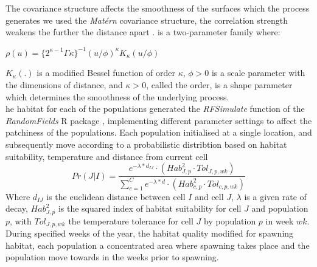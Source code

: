 \documentclass[review]{elsarticle}
\begin{document}
The covariance structure affects the smoothness of the surfaces which the
process generates we used the \textit{Matérn}
 covariance structure,
 the correlation strength weakens the further
the distance apart .
 is a two-parameter family where: 
\begin{center}
	$\rho(u) = \{2^{\kappa -
		1}\Gamma{\kappa}\}^{-1}(u/\phi)^{\kappa}K_{\kappa}(u/\phi)$
\end{center}
$K_{\kappa}(.)$ is a modified Bessel function of order $\kappa$, $\phi >
0$ is a scale parameter with the dimensions of distance, and $\kappa > 0$,
called the order, is a shape parameter which determines the smoothness of the
underlying process. \\

he habitat for each of the
populations  generated 
the \textit{RFSimulate} function of the \textit{RandomFields} R package
\citep{Schlater2015}, implementing different parameter settings to affect the
patchiness of the populations. Each population 
initialised at a single location, and subsequently move
according to a probabilistic distribtion based on habitat
suitability, temperature and distance from current cell 
\begin{equation}
	Pr(J | I) = \frac{e^{-\lambda * d_{IJ}} \cdot
		(Hab_{J,p}^2 \cdot Tol_{J,p,wk})}{\sum\limits_{c=1}^{C}e^{-\lambda * d} \cdot
		(Hab_{c,p}^2 \cdot Tol_{c,p,wk})}
\end{equation}
Where $d_{IJ}$ is the euclidean distance between cell $I$ and cell $J$,
$\lambda$ is a given rate of decay, $Hab_{J,p}^2$ is the squared index of
habitat suitability for cell $J$ and population $p$, with $Tol_{J,p,wk}$ the
temperature tolerance for cell $J$ by population $p$ in week $wk$.\\

During specified weeks of the year, the habitat quality
 modified for  spawning
habitat,  each
population  a concentrated area where spawning takes
place and the population move towards
 in the weeks prior to
spawning. \\
\end{document}
